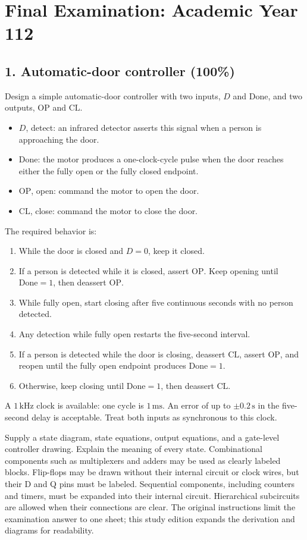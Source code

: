 \chapter{Final Examination: Academic Year 112}
\label{exam:final-112}

\section{1. Automatic-door controller (100\%)}
\begin{question}
Design a simple automatic-door controller with two inputs, \(D\) and
\(\mathrm{Done}\), and two outputs, \(\mathrm{OP}\) and \(\mathrm{CL}\).
\begin{itemize}
\item \(D\), detect: an infrared detector asserts this signal when a person
is approaching the door.
\item \(\mathrm{Done}\): the motor produces a one-clock-cycle pulse when
the door reaches either the fully open or the fully closed endpoint.
\item \(\mathrm{OP}\), open: command the motor to open the door.
\item \(\mathrm{CL}\), close: command the motor to close the door.
\end{itemize}
The required behavior is:
\begin{enumerate}
\item While the door is closed and \(D=0\), keep it closed.
\item If a person is detected while it is closed, assert \(\mathrm{OP}\).
Keep opening until \(\mathrm{Done}=1\), then deassert \(\mathrm{OP}\).
\item While fully open, start closing after five continuous seconds with
no person detected.
\item Any detection while fully open restarts the five-second interval.
\item If a person is detected while the door is closing, deassert
\(\mathrm{CL}\), assert \(\mathrm{OP}\), and reopen until the fully open
endpoint produces \(\mathrm{Done}=1\).
\item Otherwise, keep closing until \(\mathrm{Done}=1\), then deassert
\(\mathrm{CL}\).
\end{enumerate}
A \(1\,\mathrm{kHz}\) clock is available: one cycle is \(1\,\mathrm{ms}\).
An error of up to \(\pm0.2\,\mathrm{s}\) in the five-second delay is acceptable.
Treat both inputs as synchronous to this clock.

Supply a state diagram, state equations, output equations, and a
gate-level controller drawing. Explain the meaning of every state.
Combinational components such as multiplexers and adders may be used as
clearly labeled blocks. Flip-flops may be drawn without their internal
circuit or clock wires, but their D and Q pins must be labeled.
Sequential components, including counters and timers, must be expanded
into their internal circuit. Hierarchical subcircuits are allowed when
their connections are clear. The original instructions limit the
examination answer to one sheet; this study edition expands the derivation
and diagrams for readability.
\end{question}

